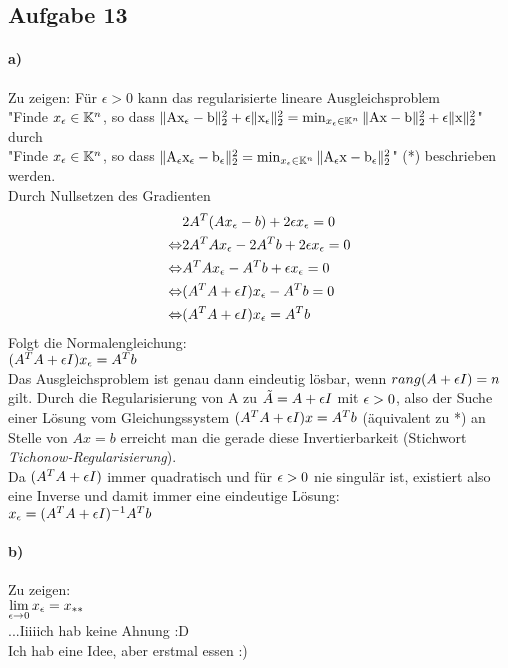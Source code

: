 \subsection*{Aufgabe 13}

\paragraph*{a)}
Zu zeigen: Für $\epsilon > 0$ kann das regularisierte lineare Ausgleichsproblem\\
\newline
"Finde $x_\epsilon \in \mathbb K^n$, so dass $\mathrm{\| Ax_\epsilon - b \|_2^2} + \epsilon\mathrm{\| x_\epsilon \|_2^2} = \min_{x_\epsilon \in \mathbb K^n}\mathrm{\| Ax - b \|_2^2} + \epsilon\mathrm{\| x \|_2^2}$"  durch\\
\newline
"Finde $x_\epsilon \in \mathbb K^n$, so dass $\mathrm{\| A_\epsilon x_\epsilon - b_\epsilon \|_2^2} = \min_{x_\epsilon \in \mathbb K^n}\mathrm{\| A_\epsilon x - b_\epsilon \|_2^2}$" (*) beschrieben werden.\\
\newline
Durch Nullsetzen des Gradienten
\begin{align*}
&2A^T(Ax_\epsilon-b)+2\epsilon x_\epsilon = 0\\
\Leftrightarrow &2A^TAx_\epsilon -2A^Tb +2\epsilon x_\epsilon = 0\\
\Leftrightarrow &A^TAx_\epsilon -A^Tb +\epsilon x_\epsilon = 0\\
\Leftrightarrow &(A^TA +\epsilon I)x_\epsilon-A^Tb  = 0\\
\Leftrightarrow &(A^TA +\epsilon I) x_\epsilon = A^Tb\\
\end{align*}
Folgt die Normalengleichung:\\
$(A^TA + \epsilon I)x_\epsilon = A^Tb$\\

Das Ausgleichsproblem ist genau dann eindeutig lösbar, wenn $rang(A+\epsilon I)=n$ gilt.
Durch die Regularisierung von A zu $\tilde{A}= A +\epsilon I$ mit $\epsilon>0$, also der Suche einer Lösung vom Gleichungssystem $(A^TA+\epsilon I)x=A^Tb$ (äquivalent zu *) an Stelle von $Ax=b$ erreicht man die gerade diese Invertierbarkeit (Stichwort \textit{Tichonow-Regularisierung}).\\
Da $(A^TA + \epsilon I)$ immer quadratisch und für $\epsilon > 0$ nie singulär ist, existiert also eine Inverse und damit immer eine eindeutige Lösung:\\
$x_\epsilon = (A^TA + \epsilon I)^{-1}A^Tb$


\paragraph*{b)}
Zu zeigen:\\
$\lim\limits_{\epsilon \rightarrow 0}{x_\epsilon} = x_{**}$\\
\newline
...Iiiiich hab keine Ahnung :D\\
Ich hab eine Idee, aber erstmal essen :)



